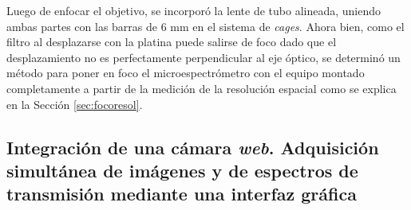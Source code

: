 \begin{figure}[H]
	\begin{floatrow}
	\end{floatrow}
\end{figure}

Luego de enfocar el objetivo, se incorporó la lente de tubo alineada, uniendo ambas partes con las barras de 6 mm en el sistema de \textit{cages}. Ahora bien, como el filtro al desplazarse con la platina puede salirse de foco dado que el desplazamiento no es perfectamente perpendicular al eje óptico, se determinó un método para poner en foco el microespectrómetro con el equipo montado completamente a partir de la medición de la resolución espacial como se explica en la Sección \ref{sec:focoresol}.



\singlespacing
\subsection{Integración de una cámara \textit{web}. Adquisición simultánea de imágenes y de espectros de transmisión mediante una interfaz gráfica \href{https://github.com/jrr1984/defectsGUI}{\faGithub}}
\label{sec:camwebgui}

